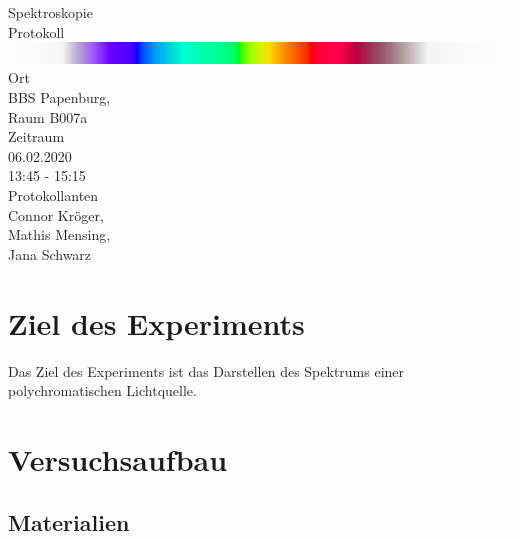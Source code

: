 \documentclass[12pt, a4paper]{article}
\begin{document}
\begin{titlepage}
\begin{center}
    \LARGE{Spektroskopie} \\
    \large{Protokoll} \\
    \vspace{10mm}
    \includegraphics[width=\textwidth]{Spektrum.png} \\
    \vspace{10mm}
    \small{Ort} \\
    \Large{ BBS Papenburg,\\ 
            Raum B007a} \\
    \vspace{10mm}
    \small{Zeitraum} \\
    \Large{ 06.02.2020 \\
            13:45 - 15:15} \\
    \vspace{15mm}
    \small{Protokollanten} \\
    \Large{ Connor Kr\"oger,\\
            Mathis Mensing,\\
            Jana Schwarz}
\end{center}

\thispagestyle{empty}
\end{titlepage}

\tableofcontents
\newpage

\section{Ziel des Experiments}
Das Ziel des Experiments ist das Darstellen des Spektrums einer polychromatischen Lichtquelle.

\section{Versuchsaufbau}
\subsection{Materialien}
\end{document}
